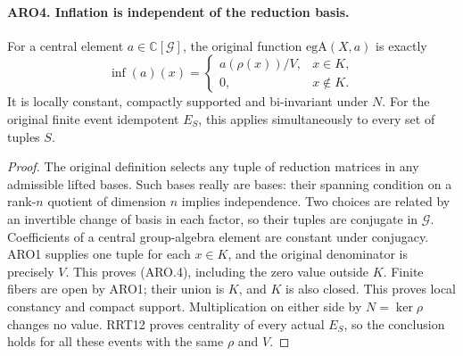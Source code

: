 \documentclass[11pt,a4paper]{article}
\numberwithin{equation}{section}
\theoremstyle{remark}\newtheorem{remark}[theorem]{Remark}
\begin{document}
\paragraph{ARO4. Inflation is independent of the reduction basis.}
\label{claim:ARO4}
For a central element \(a\in\mathbb C[\mathcal G]\), the original
function \(\mathrm{egA}(X,a)\) is exactly
\[
 \operatorname{inf}(a)(x)=
 \begin{cases}a(\rho(x))/V,&x\in K,\\0,&x\notin K.\end{cases}
 \tag{ARO.4}
\]
It is locally constant, compactly supported and bi-invariant under
\(N\).  For the original finite event idempotent \(E_S\), this
applies simultaneously to every set of tuples \(S\).
\begin{proof}
The original definition selects any tuple of reduction matrices in
any admissible lifted bases.  Such bases really are bases: their
spanning condition on a rank-\(n\) quotient of dimension \(n\)
implies independence.  Two choices are related by an invertible
change of basis in each factor, so their tuples are conjugate in
\(\mathcal G\).  Coefficients of a central group-algebra element are
constant under conjugacy.  ARO1 supplies one tuple for each \(x\in K\),
and the original denominator is precisely \(V\).  This proves
(ARO.4), including the zero value outside \(K\).
Finite fibers are open by ARO1; their union is \(K\), and \(K\)
is also closed.  This proves local constancy and compact support.
Multiplication on either side by \(N=\ker\rho\) changes no value.
RRT12 proves centrality of every actual \(E_S\), so the conclusion
holds for all these events with the same \(\rho\) and \(V\).
\end{proof}

\end{document}
